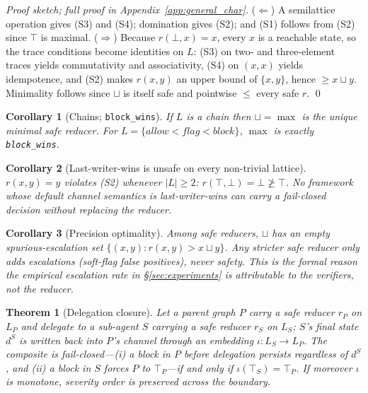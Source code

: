 \documentclass{article}
\newtheorem{theorem}{Theorem}
\newtheorem{corollary}{Corollary}
\begin{document}
\begin{proof}[Proof sketch; full proof in Appendix~\ref{app:general_char}]
($\Leftarrow$) A semilattice operation gives (S3) and (S4); domination gives (S2); and (S1)
follows from (S2) since $\top$ is maximal. ($\Rightarrow$) Because $r(\bot,x)=x$, every $x$ is
a reachable state, so the trace conditions become identities on $L$: (S3) on two- and
three-element traces yields commutativity and associativity, (S4) on $(x,x)$ yields
idempotence, and (S2) makes $r(x,y)$ an upper bound of $\{x,y\}$, hence $\ge x\sqcup y$.
Minimality follows since $\sqcup$ is itself safe and pointwise $\le$ every safe $r$. \qed
\end{proof}

\begin{corollary}[Chains; \texttt{block\_wins}]
\label{cor:chain}
If $L$ is a chain then $\sqcup=\max$ is the unique minimal safe reducer. For
$L=\{\textit{allow}<\textit{flag}<\textit{block}\}$, $\max$ is exactly \texttt{block\_wins}.
\end{corollary}

\begin{corollary}[Last-writer-wins is unsafe on every non-trivial lattice]
\label{cor:lww}
$r(x,y)=y$ violates (S2) whenever $|L|\ge2$: $r(\top,\bot)=\bot\not\ge\top$.
No framework whose default channel semantics is last-writer-wins can carry a
fail-closed decision without replacing the reducer.
\end{corollary}

\begin{corollary}[Precision optimality]
\label{cor:precision}
Among safe reducers, $\sqcup$ has an empty spurious-escalation set
$\{(x,y): r(x,y)>x\sqcup y\}$. Any stricter safe reducer only adds escalations
(soft-flag false positives), never safety. This is the formal reason the empirical
escalation rate in \S\ref{sec:experiments} is attributable to the verifiers, not the reducer.
\end{corollary}

\begin{theorem}[Delegation closure]
\label{thm:delegation}
Let a parent graph $P$ carry a safe reducer $r_P$ on $L_P$ and delegate to a
sub-agent $S$ carrying a safe reducer $r_S$ on $L_S$; $S$'s final state $d^S$ is
written back into $P$'s channel through an embedding $\iota:L_S\to L_P$.
The composite is fail-closed---(i) a block in $P$ before delegation persists
regardless of $d^S$, and (ii) a block in $S$ forces $P$ to $\top_P$---if and only
if $\iota(\top_S)=\top_P$. If moreover $\iota$ is monotone, severity order is
preserved across the boundary.
\end{theorem}
\end{document}
